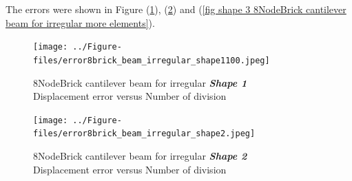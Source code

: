 \documentclass[fleqn,11pt]{article}
\begin{document}
The errors were shown in Figure (\ref{fig shape 1 8NodeBrick cantilever beam for irregular more elements}), (\ref{fig shape 2 8NodeBrick cantilever beam for irregular more elements}) and (\ref{fig shape 3 8NodeBrick cantilever beam for irregular more elements}). 
\begin{figure}[H]
    \centering
    \texttt{[image: ../Figure-files/error8brick\_beam\_irregular\_shape1100.jpeg]}
  \captionsetup{justification=centering,margin=3cm}
  \caption{8NodeBrick cantilever beam for irregular \emph{\textbf{Shape 1}}\\
      Displacement error   versus   Number of division}
  \label{fig shape 1 8NodeBrick cantilever beam for irregular more elements}
\end{figure}



\begin{figure}[H]
    \centering
    \texttt{[image: ../Figure-files/error8brick\_beam\_irregular\_shape2.jpeg]}
  \captionsetup{justification=centering,margin=3cm}
  \caption{8NodeBrick cantilever beam for irregular \emph{\textbf{Shape 2}} \\
      Displacement error   versus   Number of division}
  \label{fig shape 2 8NodeBrick cantilever beam for irregular more elements}
\end{figure}



\end{document}
